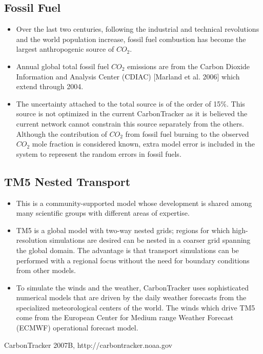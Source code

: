 \documentclass[12pt,letterpaper]{report}
\begin{document}
	\subsection*{Fossil Fuel}
	 \begin{itemize}
	 \item Over the last two centuries, following the industrial and technical revolutions and the world population increase, fossil fuel combustion has become the largest anthropogenic source of $CO_2$.
	 \item Annual global total fossil fuel $CO_2$ emissions are from the Carbon Dioxide Information and Analysis Center (CDIAC) [Marland et al. 2006] which extend through 2004.
	 \item The uncertainty attached to the total source is of the order of 15\%. This source is not optimized in the current CarbonTracker as it is believed the current network cannot constrain this source separately from the others. Although the contribution of $CO_2$ from fossil fuel burning to the observed $CO_2$ mole fraction is considered known, extra model error is included in the system to represent the random errors in fossil fuels.
	 \end{itemize}
	\subsection*{TM5 Nested Transport}
	 \begin{itemize}
	 \item This is a community-supported model whose development is shared among many scientific groups with different areas of expertise.
	 \item TM5 is a global model with two-way nested grids; regions for which high-resolution simulations are desired can be nested in a coarser grid spanning the global domain. The advantage is that transport simulations can be performed with a regional focus without the need for boundary conditions from other models.
	 \item To simulate the winds and the weather, CarbonTracker uses sophisticated numerical models that are driven by the daily weather forecasts from the specialized meteorological centers of the world.  The winds which drive TM5 come from the European Center for Medium range Weather Forecast (ECMWF) operational forecast model.
	 \end{itemize}

 \begin{thebibliography}{1}
  CarbonTracker 2007B, http://carbontracker.noaa.gov
 \end{thebibliography}
\end{document}
